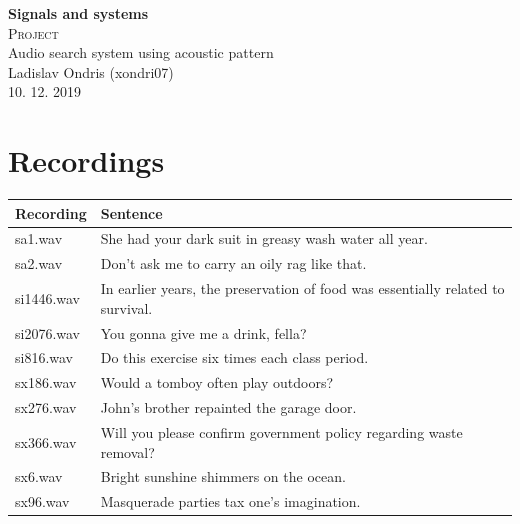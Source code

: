 \documentclass[11pt]{article}
\begin{document}
\begin{titlepage}
\center


\textbf{\Huge{Signals and systems}}
\\[4.0cm]

\textsc{\Huge {Project}}
\\[0.2cm]

\Large {Audio search system using acoustic pattern}
\\[3.0cm]

\Large{Ladislav Ondris (xondri07)}
\\[0.7cm]
\Large{10. 12. 2019}

\end{titlepage}

\newpage

\section{Recordings}
\par

\begin{center}
\begin{tabular}{ |l|l| } 
\hline
Recording & Sentence \\
\hline
sa1.wav & She had your dark suit in greasy wash water all year.  \\ 
sa2.wav & Don't ask me to carry an oily rag like that. \\ 
si1446.wav & In earlier years, the preservation of food was essentially related to survival. \\ 
si2076.wav & You gonna give me a drink, fella? \\ 
si816.wav & Do this exercise six times each class period. \\ 
sx186.wav & Would a tomboy often play outdoors? \\ 
sx276.wav & John's brother repainted the garage door. \\ 
sx366.wav & Will you please confirm government policy regarding waste removal? \\ 
sx6.wav & Bright sunshine shimmers on the ocean. \\ 
sx96.wav & Masquerade parties tax one's imagination. \\ 
\hline
\end{tabular}
\end{center}
\end{document}
